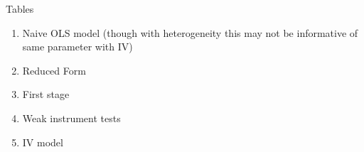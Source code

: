 \documentclass{beamer}
\begin{document}
\begin{frame}{Tables}

\begin{enumerate}
\item Naive OLS model (though with heterogeneity this may not be informative of same parameter with IV)
\item Reduced Form
\item First stage
\item Weak instrument tests
\item IV model
\end{enumerate}

\end{frame}



\begin{frame}[plain]


\end{frame}
\end{document}
